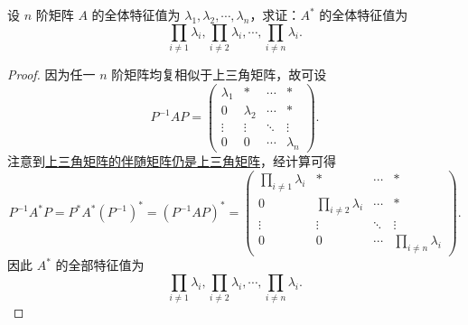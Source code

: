 \documentclass[../../main.tex]{subfiles}%
\begin{document}
\begin{proposition}[伴随矩阵的特征值]\label{proposition:伴随矩阵的特征值}
设 \( n \) 阶矩阵 \( A \) 的全体特征值为 \( \lambda_1, \lambda_2, \cdots, \lambda_n \)，求证：\( A^* \) 的全体特征值为 
\[
\prod_{i \neq 1} \lambda_i, \prod_{i \neq 2} \lambda_i, \cdots, \prod_{i \neq n} \lambda_i.
\]
\end{proposition}
\begin{proof}
因为任一 \( n \) 阶矩阵均复相似于上三角矩阵，故可设
\[
P^{-1}AP = 
\begin{pmatrix}
\lambda_1 & * & \cdots & * \\
0 & \lambda_2 & \cdots & * \\
\vdots & \vdots & \ddots & \vdots \\
0 & 0 & \cdots & \lambda_n
\end{pmatrix}.
\]
注意到\hyperref[proposition:上三角阵性质]{上三角矩阵的伴随矩阵仍是上三角矩阵}，经计算可得
\[
P^{-1}A^*P = P^*A^*(P^{-1})^* = (P^{-1}AP)^* = 
\begin{pmatrix}
\prod_{i \neq 1} \lambda_i & * & \cdots & * \\
0 & \prod_{i \neq 2} \lambda_i & \cdots & * \\
\vdots & \vdots & \ddots & \vdots \\
0 & 0 & \cdots & \prod_{i \neq n} \lambda_i
\end{pmatrix}.
\]
因此 \( A^* \) 的全部特征值为
\[
\prod_{i \neq 1} \lambda_i, \prod_{i \neq 2} \lambda_i, \cdots, \prod_{i \neq n} \lambda_i.
\]
\end{proof}
\end{document}

